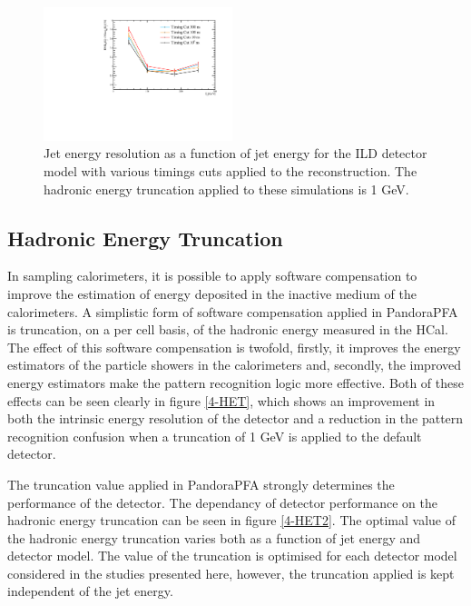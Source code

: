 \documentclass[final,3p,times,twocolumn]{elsarticle}
\begin{document}
\begin{figure}[!h]
  \begin{center}
     \includegraphics[width=0.49\textwidth]{4_BasicDetPerf/TimingCut.pdf}
     \caption{Jet energy resolution as a function of jet energy for the ILD detector model with various timings cuts applied to the reconstruction.  The hadronic energy truncation applied to these simulations is 1 GeV.  \label{4-TC}}
  \end{center}
\end{figure}

\subsection{Hadronic Energy Truncation}
\label{HET}

In sampling calorimeters, it is possible to apply software compensation to improve the estimation of energy deposited in the inactive medium of the calorimeters.  A simplistic form of software compensation applied in PandoraPFA is truncation, on a per cell basis, of the hadronic energy measured in the HCal.  The effect of this software compensation is twofold, firstly, it improves the energy estimators of the particle showers in the calorimeters and, secondly, the improved energy estimators make the pattern recognition logic more effective.  Both of these effects can be seen clearly in figure \ref{4-HET}, which shows an improvement in both the intrinsic energy resolution of the detector and a reduction in the pattern recognition confusion when a truncation of 1 GeV is applied to the default detector.

The truncation value applied in PandoraPFA strongly determines the performance of the detector.  The dependancy of detector performance on the hadronic energy truncation can be seen in figure \ref{4-HET2}.  The optimal value of the hadronic energy truncation varies both as a function of jet energy and detector model.  The value of the truncation is optimised for each detector model considered in the studies presented here, however, the truncation applied is kept independent of the jet energy.  
\end{document}
